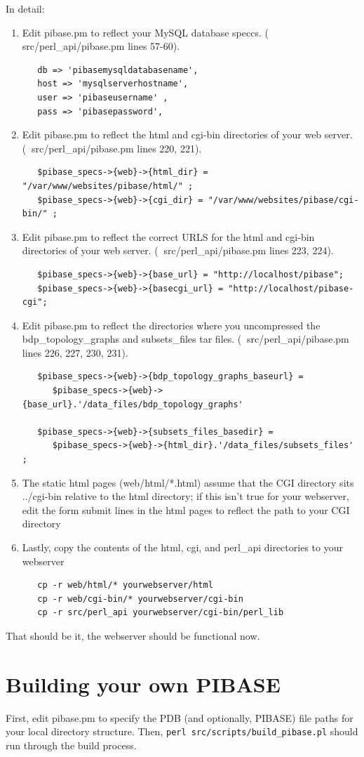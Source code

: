 \documentclass[11pt]{article}
\begin{document}
In detail:

\begin{enumerate}
\item Edit pibase.pm to reflect your MySQL database speccs. ($~$ src/perl\_api/pibase.pm lines 57-60).

\begin{verbatim}
   db => 'pibasemysqldatabasename',
   host => 'mysqlserverhostname',
   user => 'pibaseusername' ,
   pass => 'pibasepassword',
\end{verbatim}

\item Edit pibase.pm to reflect the html and cgi-bin directories of your web server. ($~$ src/perl\_api/pibase.pm lines 220, 221).
\begin{verbatim}
   $pibase_specs->{web}->{html_dir} = "/var/www/websites/pibase/html/" ;
   $pibase_specs->{web}->{cgi_dir} = "/var/www/websites/pibase/cgi-bin/" ;
\end{verbatim}

\item Edit pibase.pm to reflect the correct URLS for the html and cgi-bin directories of your web server. ($~$ src/perl\_api/pibase.pm lines 223, 224).
\begin{verbatim}
   $pibase_specs->{web}->{base_url} = "http://localhost/pibase";
   $pibase_specs->{web}->{basecgi_url} = "http://localhost/pibase-cgi";
\end{verbatim}

\item Edit pibase.pm to reflect the directories where you uncompressed the bdp\_topology\_graphs and subsets\_files tar files. ($~$ src/perl\_api/pibase.pm lines 226, 227, 230, 231).
\begin{verbatim}
   $pibase_specs->{web}->{bdp_topology_graphs_baseurl} =
      $pibase_specs->{web}->{base_url}.'/data_files/bdp_topology_graphs' 

   $pibase_specs->{web}->{subsets_files_basedir} =
      $pibase_specs->{web}->{html_dir}.'/data_files/subsets_files' ;
\end{verbatim}

\item The static html pages (web/html/*.html) assume that the CGI directory sits ../cgi-bin relative to the html directory; if this isn't true for your webserver, edit the form submit lines in the html pages to reflect the path to your CGI directory

\item Lastly, copy the contents of the html, cgi, and perl\_api directories to your webserver
\begin{verbatim}
   cp -r web/html/* yourwebserver/html
   cp -r web/cgi-bin/* yourwebserver/cgi-bin
   cp -r src/perl_api yourwebserver/cgi-bin/perl_lib
\end{verbatim}
\end{enumerate}

That should be it, the webserver should be functional now.


\part{Building your own PIBASE}

First, edit pibase.pm to specify the PDB (and optionally, PIBASE) file paths for your local directory structure. Then, {\tt perl src/scripts/build\_pibase.pl} should run through the build process.
\end{document}
